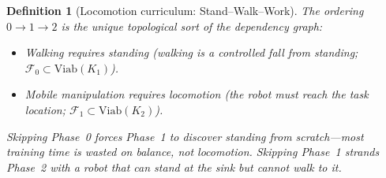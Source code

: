 \documentclass[11pt,a4paper]{article}
\newtheorem{definition}[theorem]{Definition}
\newcommand{\cF}{\mathcal{F}}
\begin{document}
\begin{definition}[Locomotion curriculum:
  Stand--Walk--Work]
\medskip\noindent
The ordering $0 \to 1 \to 2$ is the
\emph{unique topological sort} of the
dependency graph:
\begin{itemize}[nosep]
\item Walking requires standing
  (walking is a controlled fall from standing;
  $\cF_0 \subset \mathrm{Viab}(K_1)$).
\item Mobile manipulation requires locomotion
  (the robot must reach the task location;
  $\cF_1 \subset \mathrm{Viab}(K_2)$).
\end{itemize}
Skipping Phase~0 forces Phase~1 to discover
standing from scratch---most training time
is wasted on balance, not locomotion.
Skipping Phase~1 strands Phase~2 with a robot
that can stand at the sink but cannot walk to it.
\end{definition}
\end{document}
